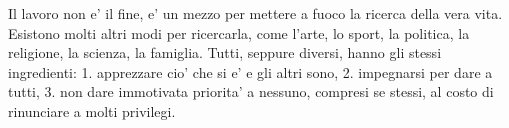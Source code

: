 Il lavoro non e' il fine, e' un mezzo per mettere a fuoco la ricerca della vera vita. Esistono molti altri modi per ricercarla, come l'arte, lo sport, la politica, la religione, la scienza, la famiglia. Tutti, seppure diversi, hanno gli stessi ingredienti: 1. apprezzare cio' che si e' e gli altri sono, 2. impegnarsi per dare a tutti, 3. non dare immotivata priorita' a nessuno, compresi se stessi, al costo di rinunciare a molti privilegi.


